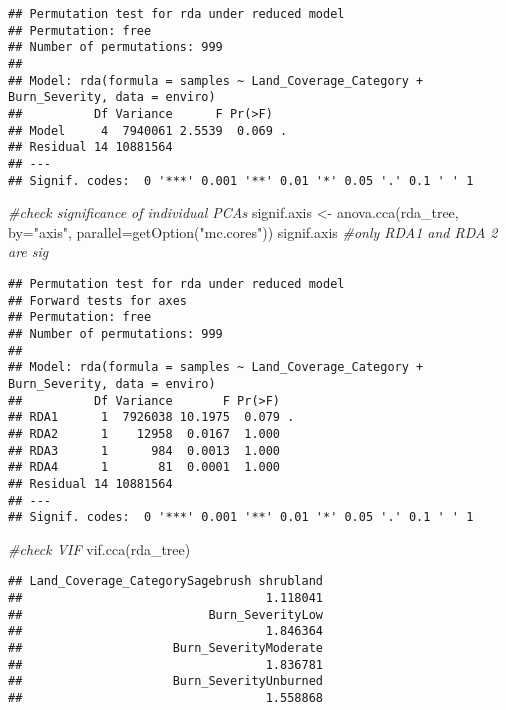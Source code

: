 \documentclass[
]{article}
\newenvironment{Shaded}{\begin{snugshade}}{\end{snugshade}}
\newcommand{\AttributeTok}[1]{\textcolor[rgb]{0.77,0.63,0.00}{#1}}
\newcommand{\CommentTok}[1]{\textcolor[rgb]{0.56,0.35,0.01}{\textit{#1}}}
\newcommand{\FunctionTok}[1]{\textcolor[rgb]{0.00,0.00,0.00}{#1}}
\newcommand{\NormalTok}[1]{#1}
\newcommand{\OtherTok}[1]{\textcolor[rgb]{0.56,0.35,0.01}{#1}}
\newcommand{\StringTok}[1]{\textcolor[rgb]{0.31,0.60,0.02}{#1}}
\begin{document}
\begin{verbatim}
## Permutation test for rda under reduced model
## Permutation: free
## Number of permutations: 999
## 
## Model: rda(formula = samples ~ Land_Coverage_Category + Burn_Severity, data = enviro)
##          Df Variance      F Pr(>F)  
## Model     4  7940061 2.5539  0.069 .
## Residual 14 10881564                
## ---
## Signif. codes:  0 '***' 0.001 '**' 0.01 '*' 0.05 '.' 0.1 ' ' 1
\end{verbatim}

\begin{Shaded}
\begin{Highlighting}[]
\CommentTok{\#check significance of individual PCAs}
\NormalTok{signif.axis }\OtherTok{\textless{}{-}} \FunctionTok{anova.cca}\NormalTok{(rda\_tree, }\AttributeTok{by=}\StringTok{"axis"}\NormalTok{, }\AttributeTok{parallel=}\FunctionTok{getOption}\NormalTok{(}\StringTok{"mc.cores"}\NormalTok{))}
\NormalTok{signif.axis }\CommentTok{\#only RDA1 and RDA 2 are sig}
\end{Highlighting}
\end{Shaded}

\begin{verbatim}
## Permutation test for rda under reduced model
## Forward tests for axes
## Permutation: free
## Number of permutations: 999
## 
## Model: rda(formula = samples ~ Land_Coverage_Category + Burn_Severity, data = enviro)
##          Df Variance       F Pr(>F)  
## RDA1      1  7926038 10.1975  0.079 .
## RDA2      1    12958  0.0167  1.000  
## RDA3      1      984  0.0013  1.000  
## RDA4      1       81  0.0001  1.000  
## Residual 14 10881564                 
## ---
## Signif. codes:  0 '***' 0.001 '**' 0.01 '*' 0.05 '.' 0.1 ' ' 1
\end{verbatim}

\begin{Shaded}
\begin{Highlighting}[]
\CommentTok{\#check VIF}
\FunctionTok{vif.cca}\NormalTok{(rda\_tree)}
\end{Highlighting}
\end{Shaded}

\begin{verbatim}
## Land_Coverage_CategorySagebrush shrubland 
##                                  1.118041 
##                          Burn_SeverityLow 
##                                  1.846364 
##                     Burn_SeverityModerate 
##                                  1.836781 
##                     Burn_SeverityUnburned 
##                                  1.558868
\end{verbatim}
\end{document}

